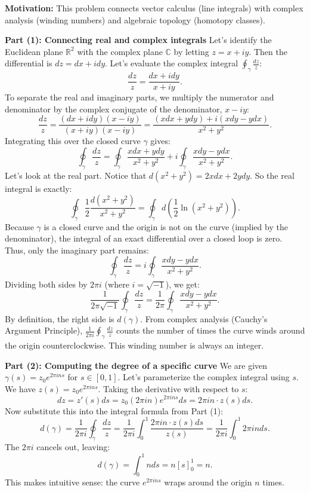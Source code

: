 \begin{solution}
\textbf{Motivation:} This problem connects vector calculus (line integrals) with complex analysis (winding numbers) and algebraic topology (homotopy classes).

\textbf{Part (1): Connecting real and complex integrals}
Let's identify the Euclidean plane $\mathbb{R}^2$ with the complex plane $\mathbb{C}$ by letting $z = x + iy$.
Then the differential is $dz = dx + i dy$.
Let's evaluate the complex integral $\oint_\gamma \frac{dz}{z}$:
\[
\frac{dz}{z} = \frac{dx + i dy}{x + iy}.
\]
To separate the real and imaginary parts, we multiply the numerator and denominator by the complex conjugate of the denominator, $x - iy$:
\[
\frac{dz}{z} = \frac{(dx + i dy)(x - iy)}{(x + iy)(x - iy)} = \frac{(x dx + y dy) + i(x dy - y dx)}{x^2 + y^2}.
\]
Integrating this over the closed curve $\gamma$ gives:
\[
\oint_\gamma \frac{dz}{z} = \oint_\gamma \frac{x dx + y dy}{x^2 + y^2} + i \oint_\gamma \frac{x dy - y dx}{x^2 + y^2}.
\]
Let's look at the real part. Notice that $d(x^2 + y^2) = 2x dx + 2y dy$. So the real integral is exactly:
\[
\oint_\gamma \frac{1}{2} \frac{d(x^2 + y^2)}{x^2 + y^2} = \oint_\gamma d\left(\frac{1}{2} \ln(x^2 + y^2)\right).
\]
Because $\gamma$ is a closed curve and the origin is not on the curve (implied by the denominator), the integral of an exact differential over a closed loop is zero.
Thus, only the imaginary part remains:
\[
\oint_\gamma \frac{dz}{z} = i \oint_\gamma \frac{x dy - y dx}{x^2 + y^2}.
\]
Dividing both sides by $2\pi i$ (where $i = \sqrt{-1}$), we get:
\[
\frac{1}{2\pi \sqrt{-1}} \oint_\gamma \frac{dz}{z} = \frac{1}{2\pi} \oint_\gamma \frac{x dy - y dx}{x^2 + y^2}.
\]
By definition, the right side is $d(\gamma)$.
From complex analysis (Cauchy's Argument Principle), $\frac{1}{2\pi i} \oint_\gamma \frac{dz}{z}$ counts the number of times the curve winds around the origin counterclockwise. This winding number is always an integer.

\textbf{Part (2): Computing the degree of a specific curve}
We are given $\gamma(s) = z_0 e^{2\pi i n s}$ for $s \in [0, 1]$.
Let's parameterize the complex integral using $s$. We have $z(s) = z_0 e^{2\pi i n s}$.
Taking the derivative with respect to $s$:
\[
dz = z'(s) ds = z_0 (2\pi i n) e^{2\pi i n s} ds = 2\pi i n \cdot z(s) ds.
\]
Now substitute this into the integral formula from Part (1):
\[
d(\gamma) = \frac{1}{2\pi i} \oint_\gamma \frac{dz}{z} = \frac{1}{2\pi i} \int_0^1 \frac{2\pi i n \cdot z(s) ds}{z(s)} = \frac{1}{2\pi i} \int_0^1 2\pi i n ds.
\]
The $2\pi i$ cancels out, leaving:
\[
d(\gamma) = \int_0^1 n ds = n [s]_0^1 = n.
\]
This makes intuitive sense: the curve $e^{2\pi i n s}$ wraps around the origin $n$ times.


\end{solution}
